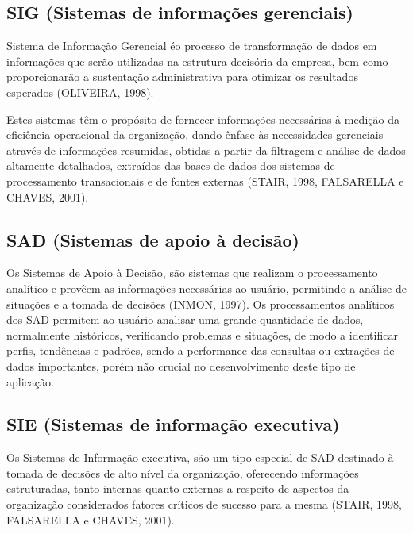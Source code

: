 \subsection{SIG (Sistemas de informa\c{c}\~{o}es gerenciais)}

Sistema de Informa\c{c}\~{a}o Gerencial \'{e}o processo de transforma\c{c}\~{a}o de dados em informa\c{c}\~{o}es que ser\~{a}o utilizadas na estrutura decis\'{o}ria da empresa, bem como proporcionar\~{a}o a sustenta\c{c}\~{a}o administrativa para otimizar os resultados esperados (OLIVEIRA, 1998).

\begin{flushleft}
	Estes sistemas têm o prop\'{o}sito de fornecer informa\c{c}\~{o}es necess\'{a}rias \`{a} medi\c{c}\~{a}o da eficiência operacional da organiza\c{c}\~{a}o, dando ênfase \`{a}s necessidades gerenciais atrav\'{e}s de informa\c{c}\~{o}es resumidas, obtidas a partir da filtragem e an\'{a}lise de dados altamente detalhados, extra\'{i}dos das bases de dados dos sistemas de processamento transacionais e de fontes externas (STAIR, 1998, FALSARELLA e CHAVES, 2001).
\end{flushleft}

\subsection{SAD (Sistemas de apoio \`{a} decis\~{a}o)}

Os Sistemas de Apoio \`{a} Decis\~{a}o, s\~{a}o sistemas que realizam o processamento anal\'{i}tico e provêem as informa\c{c}\~{o}es necess\'{a}rias ao usu\'{a}rio, permitindo a an\'{a}lise de situa\c{c}\~{o}es e a tomada de decis\~{o}es (INMON, 1997).
Os processamentos anal\'{i}ticos dos SAD permitem ao usu\'{a}rio analisar uma grande quantidade de dados, normalmente hist\'{o}ricos, verificando problemas e situa\c{c}\~{o}es, de modo a identificar perfis, tendências e padr\~{o}es, sendo a performance das consultas ou extra\c{c}\~{o}es de dados importantes, por\'{e}m n\~{a}o crucial no desenvolvimento deste tipo de aplica\c{c}\~{a}o.

\subsection{SIE (Sistemas de informa\c{c}\~{a}o executiva)}

Os Sistemas de Informa\c{c}\~{a}o executiva, s\~{a}o um tipo especial de SAD destinado \`{a} tomada de decis\~{o}es de alto n\'{i}vel da organiza\c{c}\~{a}o, oferecendo informa\c{c}\~{o}es estruturadas, tanto internas quanto externas a respeito de aspectos da organiza\c{c}\~{a}o considerados fatores cr\'{i}ticos de sucesso para a mesma (STAIR, 1998, FALSARELLA e CHAVES, 2001).

